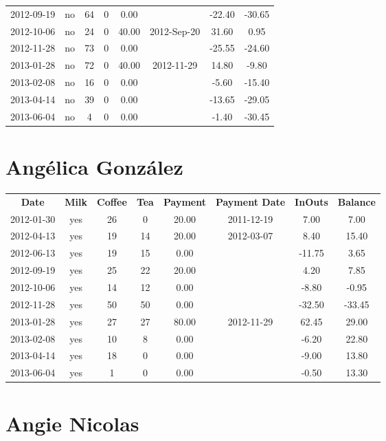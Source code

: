 \begin{center}
\begin{tabular}{cccccccc}
2012-09-19 & no & 64 & 0 &  0.00 &  & -22.40 & -30.65\\ 
2012-10-06 & no & 24 & 0 & 40.00 & 2012-Sep-20 &  31.60 &   0.95\\ 
2012-11-28 & no & 73 & 0 &  0.00 &  & -25.55 & -24.60\\ 
2013-01-28 & no & 72 & 0 & 40.00 & 2012-11-29 &  14.80 &  -9.80\\ 
2013-02-08 & no & 16 & 0 &  0.00 &  &  -5.60 & -15.40\\ 
2013-04-14 & no & 39 & 0 &  0.00 &  & -13.65 & -29.05\\ 
2013-06-04 & no &  4 & 0 &  0.00 &  &  -1.40 & -30.45
\end{tabular}
\end{center}

\section{Ang\'elica Gonz\'alez}

\begin{center}
\begin{tabular}{cccccccc}
\textbf{Date} & \textbf{Milk} & \textbf{Coffee} & \textbf{Tea} & \textbf{Payment} & \textbf{Payment Date} & \textbf{InOuts} & \textbf{Balance} \\
2012-01-30 & yes & 26 &  0 & 20.00 & 2011-12-19 &   7.00 &   7.00\\ 
2012-04-13 & yes & 19 & 14 & 20.00 & 2012-03-07 &   8.40 &  15.40\\ 
2012-06-13 & yes & 19 & 15 &  0.00 &  & -11.75 &   3.65\\ 
2012-09-19 & yes & 25 & 22 & 20.00 &  &   4.20 &   7.85\\ 
2012-10-06 & yes & 14 & 12 &  0.00 &  &  -8.80 &  -0.95\\ 
2012-11-28 & yes & 50 & 50 &  0.00 &  & -32.50 & -33.45\\ 
2013-01-28 & yes & 27 & 27 & 80.00 & 2012-11-29 &  62.45 &  29.00\\ 
2013-02-08 & yes & 10 &  8 &  0.00 &  &  -6.20 &  22.80\\ 
2013-04-14 & yes & 18 &  0 &  0.00 &  &  -9.00 &  13.80\\ 
2013-06-04 & yes &  1 &  0 &  0.00 &  &  -0.50 &  13.30
\end{tabular}
\end{center}

\section{Angie Nicolas}

